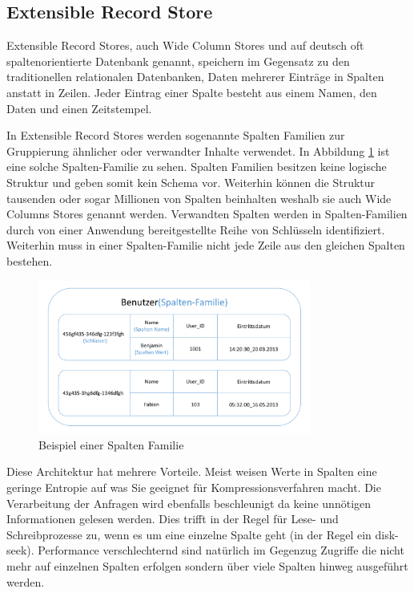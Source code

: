 \subsection{Extensible Record Store}
\label{ch:grundlagen:sec:NoSQL:ExtensibleRecordStore}

Extensible Record Stores, auch Wide Column Stores und auf deutsch oft spaltenorientierte Datenbank genannt, speichern im Gegensatz zu den traditionellen relationalen Datenbanken, Daten mehrerer Einträge in Spalten anstatt in Zeilen. Jeder Eintrag einer Spalte besteht aus einem Namen, den Daten und einen Zeitstempel.

In Extensible Record Stores werden sogenannte Spalten Familien zur Gruppierung ähnlicher oder verwandter Inhalte verwendet. In Abbildung \ref{wide_column_store} ist eine solche Spalten-Familie zu sehen. Spalten Familien besitzen keine logische Struktur und geben somit kein Schema vor. Weiterhin können die Struktur tausenden oder sogar Millionen von Spalten beinhalten weshalb sie auch Wide Columns Stores genannt werden. Verwandten Spalten werden in Spalten-Familien durch von einer Anwendung bereitgestellte Reihe von Schlüsseln identifiziert. Weiterhin muss in einer Spalten-Familie nicht jede Zeile aus den gleichen Spalten bestehen.

\begin{figure}[H]
	\centering
  \includegraphics[width=0.8\textwidth, width=0.8\textwidth]{pics/wide_column_stores.pdf}
	\caption{Beispiel einer Spalten Familie}
	\label{wide_column_store}
\end{figure}

Diese Architektur hat mehrere Vorteile. Meist weisen Werte in Spalten eine geringe Entropie auf was Sie geeignet für Kompressionsverfahren macht. Die Verarbeitung der Anfragen wird ebenfalls beschleunigt da keine unnötigen Informationen gelesen werden. Dies trifft in der Regel für Lese- und Schreibprozesse zu, wenn es um eine einzelne Spalte geht (in der Regel ein disk-seek). Performance verschlechternd sind natürlich im Gegenzug Zugriffe die nicht mehr auf einzelnen Spalten erfolgen sondern über viele Spalten hinweg ausgeführt werden.

